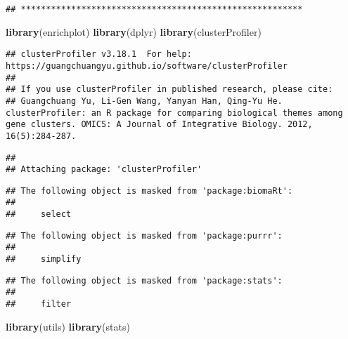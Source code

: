 \documentclass[
]{article}
\newenvironment{Shaded}{\begin{snugshade}}{\end{snugshade}}
\newcommand{\KeywordTok}[1]{\textcolor[rgb]{0.13,0.29,0.53}{\textbf{#1}}}
\newcommand{\NormalTok}[1]{#1}
\begin{document}
\begin{verbatim}
## ********************************************************
\end{verbatim}

\begin{Shaded}
\begin{Highlighting}[]
\KeywordTok{library}\NormalTok{(enrichplot)}
\KeywordTok{library}\NormalTok{(dplyr)}
\KeywordTok{library}\NormalTok{(clusterProfiler)}
\end{Highlighting}
\end{Shaded}

\begin{verbatim}
## clusterProfiler v3.18.1  For help: https://guangchuangyu.github.io/software/clusterProfiler
## 
## If you use clusterProfiler in published research, please cite:
## Guangchuang Yu, Li-Gen Wang, Yanyan Han, Qing-Yu He. clusterProfiler: an R package for comparing biological themes among gene clusters. OMICS: A Journal of Integrative Biology. 2012, 16(5):284-287.
\end{verbatim}

\begin{verbatim}
## 
## Attaching package: 'clusterProfiler'
\end{verbatim}

\begin{verbatim}
## The following object is masked from 'package:biomaRt':
## 
##     select
\end{verbatim}

\begin{verbatim}
## The following object is masked from 'package:purrr':
## 
##     simplify
\end{verbatim}

\begin{verbatim}
## The following object is masked from 'package:stats':
## 
##     filter
\end{verbatim}

\begin{Shaded}
\begin{Highlighting}[]
\KeywordTok{library}\NormalTok{(utils)}
\KeywordTok{library}\NormalTok{(stats)}
\end{Highlighting}
\end{Shaded}
\end{document}
